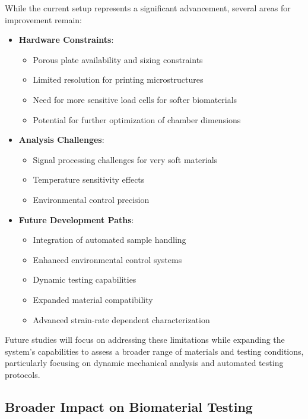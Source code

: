 While the current setup represents a significant advancement, several areas for improvement remain:

\begin{itemize}
    \item \textbf{Hardware Constraints}:
    \begin{itemize}
        \item Porous plate availability and sizing constraints
        \item Limited resolution for printing microstructures
        \item Need for more sensitive load cells for softer biomaterials
        \item Potential for further optimization of chamber dimensions
    \end{itemize}
    
    \item \textbf{Analysis Challenges}:
    \begin{itemize}
        \item Signal processing challenges for very soft materials
        \item Temperature sensitivity effects
        \item Environmental control precision
    \end{itemize}
    
    \item \textbf{Future Development Paths}:
    \begin{itemize}
        \item Integration of automated sample handling
        \item Enhanced environmental control systems
        \item Dynamic testing capabilities
        \item Expanded material compatibility
        \item Advanced strain-rate dependent characterization
    \end{itemize}
\end{itemize}

Future studies will focus on addressing these limitations while expanding the system's capabilities to assess a broader range of materials and testing conditions, particularly focusing on dynamic mechanical analysis and automated testing protocols.

\subsection{Broader Impact on Biomaterial Testing}

